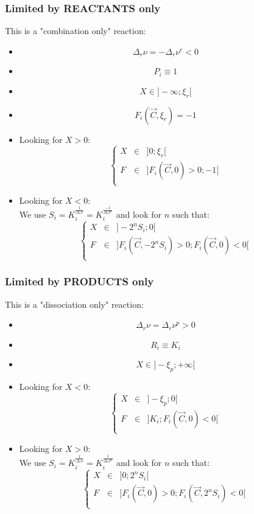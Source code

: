 \documentclass[aps,12pt]{revtex4}
\begin{document}
\subsubsection{Limited by REACTANTS only}
This is a "combination only" reaction:
\begin{itemize}
\item
$$
	\Delta_r \nu = - \Delta_r \nu^r < 0 
$$
\item $$P_i \equiv 1$$
\item $$X \in \rbrack -\infty; \xi_r \lbrack$$
\item $$F_i(\vec{C},\xi_r)=-1$$
\item Looking for $X>0$:
 $$
 \left\lbrace
 \begin{array}{rcl}
 	X &\in& \rbrack 0;\xi_r \lbrack\\
	F &\in& \rbrack F_i(\vec{C},0)>0 ; -1 \lbrack\\
\end{array}
\right.
 $$
 \item Looking for $X<0$:\\
 We use $S_i=K_i^{\frac{1}{\Delta_r \nu}}=K_i^{\frac{-1}{\Delta_r \nu^r}}$
 and look for $n$ such that:
 $$
 	\left\lbrace
 \begin{array}{rcl}
 	X &\in& \rbrack -2^n S_i;0 \lbrack\\
	F &\in& \rbrack F_i(\vec{C},-2^nS_i)>0 ; F_i(\vec{C},0)<0 \lbrack\\
\end{array}
\right.
 $$
\end{itemize}
 	
\subsubsection{Limited by PRODUCTS only}
This is a "dissociation only" reaction:
\begin{itemize}
\item
$$
	\Delta_r \nu =  \Delta_r \nu^p > 0 
$$
\item
$$
	R_i \equiv K_i
$$
\item
$$
	X \in \rbrack -\xi_p; +\infty \lbrack
$$
\item Looking for $X<0$:
$$
 \left\lbrace
 \begin{array}{rcl}
 	X &\in& \rbrack -\xi_p; 0 \lbrack\\
	F &\in& \rbrack K_i; F_i(\vec{C},0)<0 \lbrack\\
\end{array}
\right.
$$
\item Looking for $X>0$:\\
 We use $S_i=K_i^{\frac{1}{\Delta_r \nu}}=K_i^{\frac{1}{\Delta_r \nu^p}}$
 and look for $n$ such that:
 $$
 	\left\lbrace
 \begin{array}{rcl}
 	X &\in& \rbrack 0; 2^n S_i\lbrack\\
	F &\in& \rbrack F_i(\vec{C},0)>0; F_i(\vec{C},2^nS_i)<0 \lbrack\\
\end{array}
\right.
 $$

\end{itemize}
\end{document}
